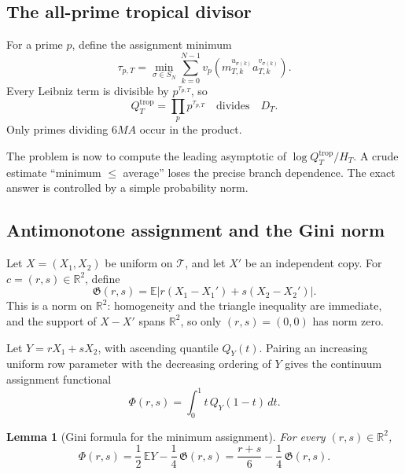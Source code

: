 \documentclass[11pt,oneside]{article}
\newtheorem{lemma}[theorem]{Lemma}
\theoremstyle{definition}
\theoremstyle{remark}
\newcommand{\R}{\mathbb R}
\newcommand{\DeltaTri}{\mathcal T}
\begin{document}
\subsection{The all-prime tropical divisor}

For a prime $p$, define the assignment minimum
\begin{equation}\label{eq:taup}
 \tau_{p,T}
 =\min_{\sigma\in S_N}
   \sum_{k=0}^{N-1}
   v_p\!\left(m_{T,k}^{u_{\sigma(k)}}a_{T,k}^{v_{\sigma(k)}}\right).
\end{equation}
Every Leibniz term is divisible by $p^{\tau_{p,T}}$, so
\begin{equation}\label{eq:Qtrop}
  Q_T^{\mathrm{trop}}=\prod_p p^{\tau_{p,T}}
  \quad\text{divides}\quad D_T.
\end{equation}
Only primes dividing $6MA$ occur in the product.

The problem is now to compute the leading asymptotic of
$\log Q_T^{\mathrm{trop}}/H_T$.  A crude estimate ``minimum $\le$ average'' loses the precise
branch dependence.  The exact answer is controlled by a simple probability norm.

\subsection{Antimonotone assignment and the Gini norm}

Let $X=(X_1,X_2)$ be uniform on $\DeltaTri$, and let $X'$ be an independent copy.  For
$c=(r,s)\in\R^2$, define
\begin{equation}\label{eq:Gini}
  \mathfrak G(r,s)
  =\mathbb E\left|r(X_1-X_1')+s(X_2-X_2')\right|.
\end{equation}
This is a norm on $\R^2$: homogeneity and the triangle inequality are immediate, and the
support of $X-X'$ spans $\R^2$, so only $(r,s)=(0,0)$ has norm zero.

Let $Y=rX_1+sX_2$, with ascending quantile $Q_Y(t)$.  Pairing an increasing uniform row
parameter with the decreasing ordering of $Y$ gives the continuum assignment functional
\begin{equation}\label{eq:Phi-def}
  \Phi(r,s)=\int_0^1 t\,Q_Y(1-t)\,dt.
\end{equation}

\begin{lemma}[Gini formula for the minimum assignment]\label{lem:gini-assignment}
For every $(r,s)\in\R^2$,
\begin{equation}\label{eq:Phi-G}
  \Phi(r,s)
  =\frac12\,\mathbb E Y-\frac14\,\mathfrak G(r,s)
  =\frac{r+s}{6}-\frac14\,\mathfrak G(r,s).
\end{equation}
\end{lemma}
\end{document}
